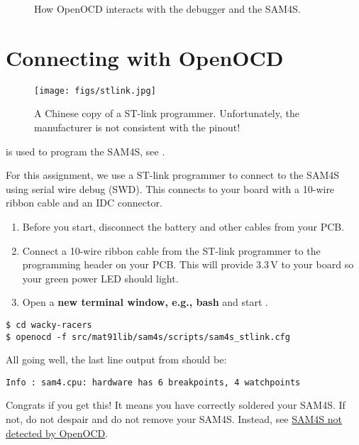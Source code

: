 \begin{figure}

\caption{How OpenOCD interacts with the debugger and the SAM4S.}
\label{fig:openocd diagram}
\end{figure}


\section{Connecting with OpenOCD}
\label{openocd}

\begin{figure}[!h]
  \centering \texttt{[image: figs/stlink.jpg]}
  \caption{A Chinese copy of a ST-link programmer.  Unfortunately, the
    manufacturer is not consistent with the pinout!}
  \label{fig:stlink}
\end{figure}


 is used to program the SAM4S, see .

For this assignment, we use a ST-link programmer to connect to the
SAM4S using serial wire debug (SWD). This connects to your board with
a 10-wire ribbon cable and an IDC connector.

\begin{enumerate}
\item
  Before you start, disconnect the battery and other cables from your
  PCB.
\item
  Connect a 10-wire ribbon cable from the ST-link programmer to the
  programming header on your PCB. This will provide 3.3\,V to your
  board so your green power LED should light.
\item
  Open a \textbf{new terminal window, e.g., bash} and
  start .
\end{enumerate}

\begin{verbatim}
$ cd wacky-racers
$ openocd -f src/mat91lib/sam4s/scripts/sam4s_stlink.cfg
\end{verbatim}

All going well, the last line output from  should be:

\begin{verbatim}
Info : sam4.cpu: hardware has 6 breakpoints, 4 watchpoints
\end{verbatim}

Congrats if you get this! It means you have correctly soldered your
SAM4S. If not, do not despair and do not remove your SAM4S. Instead,
see \protect\hyperref[sam4s-not-detected-by-openocd]{SAM4S not
  detected by OpenOCD}.



